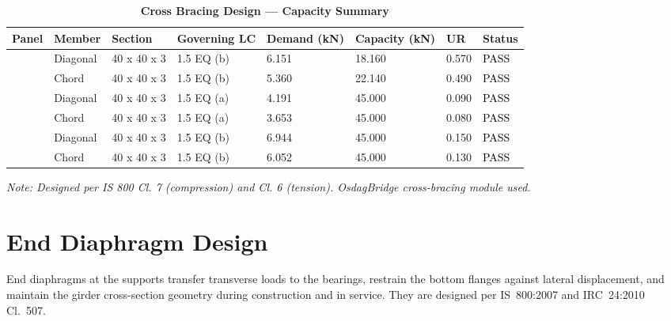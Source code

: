 \documentclass[12pt,a4paper]{report}
\numberwithin{table}{chapter}
\numberwithin{figure}{chapter}
\begin{document}
\vspace{1em}
\begin{longtable}{|C{2.0cm}|L{1.8cm}|C{2.2cm}|C{3.0cm}|C{1.8cm}|C{1.8cm}|C{1.2cm}|C{1.8cm}|}
\caption{\textbf{Cross Bracing Design --- Capacity Summary}}
\hline
\textbf{Panel} & \textbf{Member} & \textbf{Section} & \textbf{Governing LC} & \textbf{Demand (kN)} & \textbf{Capacity (kN)} & \textbf{UR} & \textbf{Status} \\[6pt]
\hline
{} & Diagonal & 40 x 40 x 3 & 1.5 EQ (b) & 6.151 & 18.160 & 0.570 & \textcolor{black}{PASS} \\[6pt]
 & Chord & 40 x 40 x 3 & 1.5 EQ (b) & 5.360 & 22.140 & 0.490 & \textcolor{black}{PASS} \\[6pt]
\hline
{} & Diagonal & 40 x 40 x 3 & 1.5 EQ (a) & 4.191 & 45.000 & 0.090 & \textcolor{black}{PASS} \\[6pt]
 & Chord & 40 x 40 x 3 & 1.5 EQ (a) & 3.653 & 45.000 & 0.080 & \textcolor{black}{PASS} \\[6pt]
\hline
{} & Diagonal & 40 x 40 x 3 & 1.5 EQ (b) & 6.944 & 45.000 & 0.150 & \textcolor{black}{PASS} \\[6pt]
 & Chord & 40 x 40 x 3 & 1.5 EQ (b) & 6.052 & 45.000 & 0.130 & \textcolor{black}{PASS} \\[6pt]
\hline
\end{longtable}
\noindent\textit{Note: Designed per IS 800 Cl. 7 (compression) and Cl. 6 (tension). OsdagBridge cross-bracing module used.}

\section{End Diaphragm Design}
\label{sec:end-diaphragm}

End diaphragms at the supports transfer transverse loads to the bearings, restrain the bottom flanges against lateral displacement, and maintain the girder cross-section geometry during construction and in service. They are designed per IS~800:2007 and IRC~24:2010 Cl.~507.

\vspace{1em}

\vspace{0.4em}
\noindent
\setlength{\tabcolsep}{4pt}
\setlength{\LTleft}{0pt}
\setlength{\LTright}{\fill}
\end{document}
